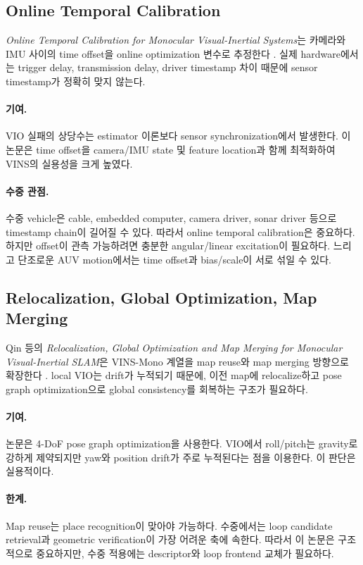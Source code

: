 \documentclass[11pt,a4paper]{article}
\newcommand{\paper}[1]{\textit{#1}}
\begin{document}
\subsection{Online Temporal Calibration}

\paper{Online Temporal Calibration for Monocular Visual-Inertial Systems}는 카메라와 IMU 사이의 time offset을 online optimization 변수로 추정한다 \cite{qin2018temporal}.
실제 hardware에서는 trigger delay, transmission delay, driver timestamp 차이 때문에 sensor timestamp가 정확히 맞지 않는다.

\paragraph{기여.}
VIO 실패의 상당수는 estimator 이론보다 sensor synchronization에서 발생한다.
이 논문은 time offset을 camera/IMU state 및 feature location과 함께 최적화하여 VINS의 실용성을 크게 높였다.

\paragraph{수중 관점.}
수중 vehicle은 cable, embedded computer, camera driver, sonar driver 등으로 timestamp chain이 길어질 수 있다.
따라서 online temporal calibration은 중요하다.
하지만 offset이 관측 가능하려면 충분한 angular/linear excitation이 필요하다.
느리고 단조로운 AUV motion에서는 time offset과 bias/scale이 서로 섞일 수 있다.

\subsection{Relocalization, Global Optimization, Map Merging}

Qin 등의 \paper{Relocalization, Global Optimization and Map Merging for Monocular Visual-Inertial SLAM}은 VINS-Mono 계열을 map reuse와 map merging 방향으로 확장한다 \cite{qin2018relocalization}.
local VIO는 drift가 누적되기 때문에, 이전 map에 relocalize하고 pose graph optimization으로 global consistency를 회복하는 구조가 필요하다.

\paragraph{기여.}
논문은 4-DoF pose graph optimization을 사용한다.
VIO에서 roll/pitch는 gravity로 강하게 제약되지만 yaw와 position drift가 주로 누적된다는 점을 이용한다.
이 판단은 실용적이다.

\paragraph{한계.}
Map reuse는 place recognition이 맞아야 가능하다.
수중에서는 loop candidate retrieval과 geometric verification이 가장 어려운 축에 속한다.
따라서 이 논문은 구조적으로 중요하지만, 수중 적용에는 descriptor와 loop frontend 교체가 필요하다.
\end{document}
